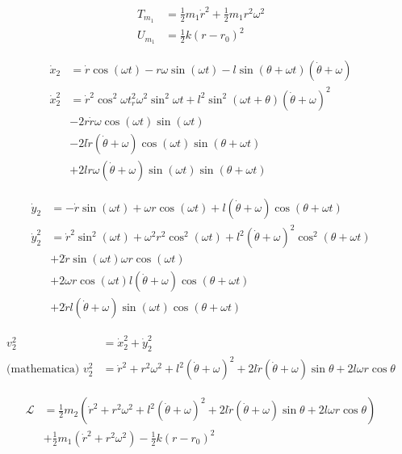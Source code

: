 \documentclass[letter, 10pts]{article}
\begin{document}
\begin{align*}
	T_{m_1} &= \frac{1}{2}m_1 \dot r ^2 + \frac{1}{2} m_1 r^2 \omega^2 \\
	U_{m_1} &= \frac{1}{2} k (r - r_0)^2 
\end{align*}

\begin{minipage}{0.5\textwidth}
\begin{align*}
	\dot x_2 &= \dot r \cos ( \omega t)  - r \omega \sin (\omega t) - l \sin ( \theta + \omega t) ( \dot \theta + \omega) \\ 
	\dot x_2 ^2 &= 
\dot r ^2 \cos ^2 \omega t  _ 
r^2 \omega ^2 \sin ^2 \omega t + 
l^2 \sin ^2 ( \omega t + \theta) (\dot \theta + \omega )^2  
		 \\ & 
	- 2 r \dot r \omega \cos ( \omega t) \sin ( \omega t)  \\ & 
	- 2 l \dot r ( \dot \theta + \omega ) \cos ( \omega t) \sin ( \theta + \omega t) \\ & 
	+ 2 l r \omega ( \dot \theta + \omega ) \sin ( \omega t) \sin ( \theta + \omega t)
\end{align*}
\end{minipage}
\hfill
\begin{minipage}{0.5\textwidth}
\begin{align*}
	\dot y_2 &=
- \dot r \sin( \omega t) + \omega r \cos ( \omega t) + l ( \dot \theta + \omega) \cos ( \theta + \omega t)
	\\
	\dot y^2 _2 &= 
\dot r ^2 \sin ^2 ( \omega t)  + 
	\omega^2 r^2 \cos ^2 ( \omega t) + l^2 ( \dot \theta + \omega )^2 \cos ^2 ( \theta + \omega t) \\ &
+ 2 \dot r \sin( \omega t) \omega r \cos ( \omega t) \\ &
+ 2 \omega r \cos ( \omega t) l (\dot \theta + \omega ) \cos( \theta + \omega t) \\ & 
+ 2 \dot r l ( \dot \theta + \omega ) \sin ( \omega t) \cos( \theta + \omega t)
\end{align*}
\end{minipage}

\begin{align*}
	v^2_2 &= \dot x_2 ^2 +  \dot y_2^2 \\
	\text{(mathematica) } v_2^2&= 
\dot r^2  + 
r^2 \omega ^2 + 
l^2 ( \dot \theta + \omega)^2 + 
2 l \dot r (\dot \theta + \omega ) \sin \theta + 
2 l \omega r \cos \theta 
\end{align*}

\begin{align*}
	\mathcal L &= 
\frac{1}{2} m_2 
\left(
\dot r^2  + 
r^2 \omega ^2 + 
l^2 ( \dot \theta + \omega)^2 + 
2 l \dot r (\dot \theta + \omega ) \sin \theta + 
2 l \omega r \cos \theta 
\right)
	\\ 
		   & + \frac{1}{2}m_1 (\dot r^2 + r^2 \omega ^2) - \frac{1}{2} k (r - r_0)^2
\end{align*}
\end{document}

